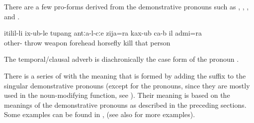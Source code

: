There are a few pro-forms derived from the demonstrative pronouns such as  ,   ,  , and  .

\begin{exe}
	 \label{ex:thehorseflyandtheman}
	\sn
	\gll	itilil-li	ix-ub-le	tupang	antːa-l-cːe	zija=ra	kax-ub	ca-b	il	admi=ra\\
		other-	throw	weapon	forehead horsefly	kill		that	person\\
	\glt	{}
\end{exe}

The temporal/clausal adverb   is diachronically the  case form of the pronoun  .

There is a series of  with the meaning  that is formed by adding the suffix  to the singular demonstrative pronouns (except for the  pronouns, since they are mostly used in the noun-modifying function, see ). Their meaning is based on the meanings of the demonstrative pronouns as described in the preceding sections. Some examples can be found in ,  (see also  for more examples).

